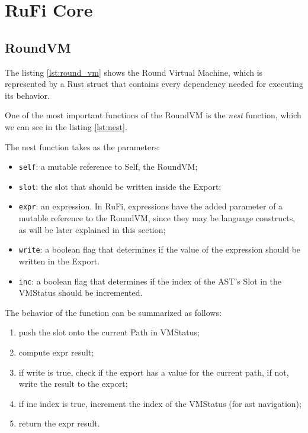 \section{RuFi Core}

\subsection{RoundVM}
The listing \ref{lst:round_vm} shows the Round Virtual Machine, which is represented by a Rust struct that contains every dependency needed for executing its behavior.



One of the most important functions of the RoundVM is the \textit{nest} function, which we can see in the listing \ref{lst:nest}.



The nest function takes as the parameters:

\begin{itemize}
    \item \texttt{self}: a mutable reference to Self, the RoundVM;
    \item \texttt{slot}: the slot that should be written inside the Export;
    \item \texttt{expr}: an expression. In RuFi, expressions have the added parameter of a mutable reference to the RoundVM, since they may be language constructs, as will be later
          explained in this section;
    \item \texttt{write}: a boolean flag that determines if the value of the expression should be written in the Export.
    \item \texttt{inc}: a boolean flag that determines if the index of the AST's Slot in the VMStatus should be incremented.
\end{itemize}

The behavior of the function can be summarized as follows:

\begin{enumerate}
    \item push the slot onto the current Path in VMStatus;
    \item compute expr result;
    \item if write is true, check if the export has a value for the current path, if not, write the result to the export;
    \item if inc index is true, increment the index of the VMStatus (for ast navigation);
    \item return the expr result.
\end{enumerate}

